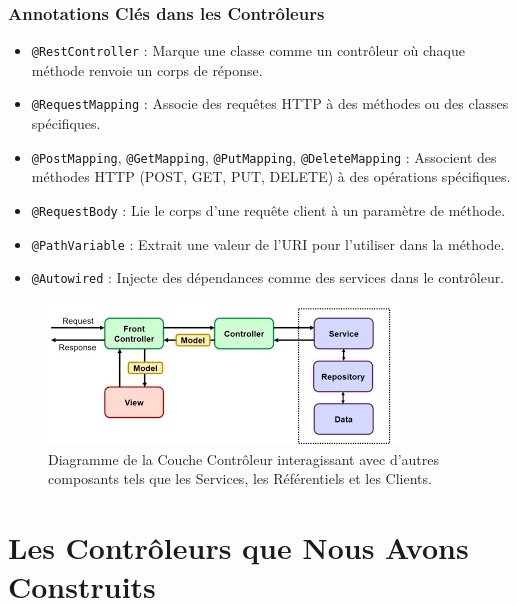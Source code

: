 \documentclass[a4paper,12pt]{article}
\begin{document}
\subsubsection{Annotations Clés dans les Contrôleurs}
\begin{itemize}
    \item \texttt{@RestController} : Marque une classe comme un contrôleur où chaque méthode renvoie un corps de réponse.
    \item \texttt{@RequestMapping} : Associe des requêtes HTTP à des méthodes ou des classes spécifiques.
    \item \texttt{@PostMapping}, \texttt{@GetMapping}, \texttt{@PutMapping}, \texttt{@DeleteMapping} : Associent des méthodes HTTP (POST, GET, PUT, DELETE) à des opérations spécifiques.
    \item \texttt{@RequestBody} : Lie le corps d'une requête client à un paramètre de méthode.
    \item \texttt{@PathVariable} : Extrait une valeur de l'URI pour l'utiliser dans la méthode.
    \item \texttt{@Autowired} : Injecte des dépendances comme des services dans le contrôleur.
\end{itemize}
\noindent\begin{figure}[h!]
    \centering
    \includegraphics[width=\textwidth]{images/controller_layer01.jpg}
    \caption{Diagramme de la Couche Contrôleur interagissant avec d'autres composants tels que les Services, les Référentiels et les Clients.}
    \label{fig:controller_layer_diagram}
\end{figure}

\section{Les Contrôleurs que Nous Avons Construits}
\end{document}
